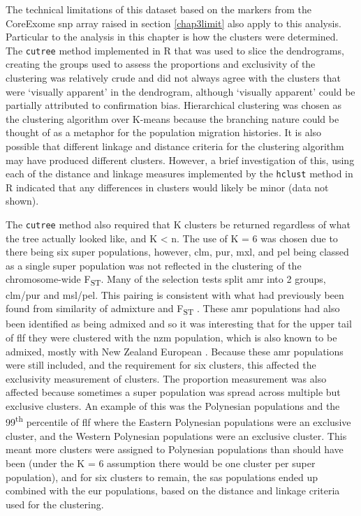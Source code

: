 \documentclass[twoside,openright]{report}
\begin{document}
The technical limitations of this dataset based on the markers from the
CoreExome \gls{snp} array raised in section \ref{chap3limit} also apply
to this analysis. Particular to the analysis in this chapter is how the
clusters were determined. The \texttt{cutree} method implemented in R
\citep{RCoreTeam2017} that was used to slice the dendrograms, creating
the groups used to assess the proportions and exclusivity of the
clustering was relatively crude and did not always agree with the
clusters that were `visually apparent' in the dendrogram, although
`visually apparent' could be partially attributed to confirmation bias.
Hierarchical clustering was chosen as the clustering algorithm over
K-means because the branching nature could be thought of as a metaphor
for the population migration histories. It is also possible that
different linkage and distance criteria for the clustering algorithm may
have produced different clusters. However, a brief investigation of
this, using each of the distance and linkage measures implemented by the
\texttt{hclust} method in R indicated that any differences in clusters
would likely be minor (data not shown).

The \texttt{cutree} method also required that K clusters be returned
regardless of what the tree actually looked like, and K \textless{} n.
The use of K = 6 was chosen due to there being six super populations,
however, \gls{clm}, \gls{pur}, \gls{mxl}, and \gls{pel} being classed as
a single super population was not reflected in the clustering of the
chromosome-wide F\textsubscript{ST}. Many of the selection tests split
\gls{amr} into 2 groups, \gls{clm}/\gls{pur} and \gls{msl}/\gls{pel}.
This pairing is consistent with what had previously been found from
similarity of admixture and F\textsubscript{ST}
\citep{Gravel2013, 1KGP2015snp}. These \gls{amr} populations had also
been identified as being admixed and so it was interesting that for the
upper tail of \gls{flf} they were clustered with the \gls{nzm}
population, which is also known to be admixed, mostly with New Zealand
European \citep{Hollis-Moffatt2012, Gravel2013}. Because these \gls{amr}
populations were still included, and the requirement for six clusters,
this affected the exclusivity measurement of clusters. The proportion
measurement was also affected because sometimes a super population was
spread across multiple but exclusive clusters. An example of this was
the Polynesian populations and the 99\textsuperscript{th} percentile of
\gls{flf} where the Eastern Polynesian populations were an exclusive
cluster, and the Western Polynesian populations were an exclusive
cluster. This meant more clusters were assigned to Polynesian
populations than should have been (under the K = 6 assumption there
would be one cluster per super population), and for six clusters to
remain, the \gls{sas} populations ended up combined with the \gls{eur}
populations, based on the distance and linkage criteria used for the
clustering.
\end{document}
